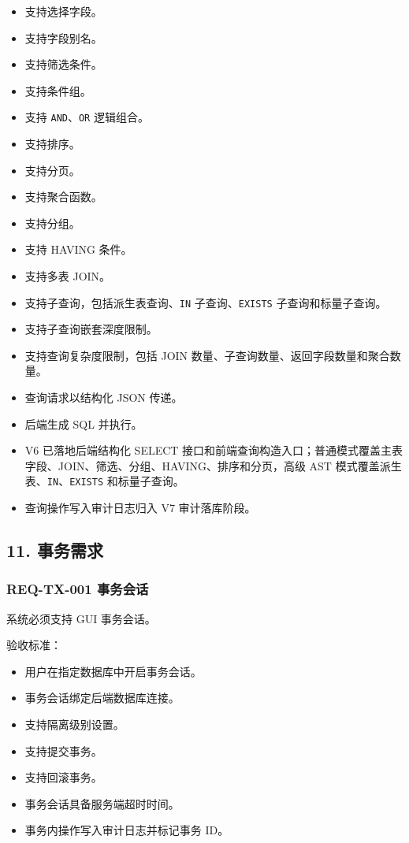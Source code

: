 \documentclass[
  a4paper,
  UTF8]{ctexart}
\providecommand{\tightlist}{%
  \setlength{\itemsep}{0pt}\setlength{\parskip}{0pt}}
\begin{document}
\begin{itemize}
\tightlist
\item
  支持选择字段。
\item
  支持字段别名。
\item
  支持筛选条件。
\item
  支持条件组。
\item
  支持 \texttt{AND}、\texttt{OR} 逻辑组合。
\item
  支持排序。
\item
  支持分页。
\item
  支持聚合函数。
\item
  支持分组。
\item
  支持 HAVING 条件。
\item
  支持多表 JOIN。
\item
  支持子查询，包括派生表查询、\texttt{IN} 子查询、\texttt{EXISTS}
  子查询和标量子查询。
\item
  支持子查询嵌套深度限制。
\item
  支持查询复杂度限制，包括 JOIN
  数量、子查询数量、返回字段数量和聚合数量。
\item
  查询请求以结构化 JSON 传递。
\item
  后端生成 SQL 并执行。
\item
  V6 已落地后端结构化 SELECT
  接口和前端查询构造入口；普通模式覆盖主表字段、JOIN、筛选、分组、HAVING、排序和分页，高级
  AST 模式覆盖派生表、\texttt{IN}、\texttt{EXISTS} 和标量子查询。
\item
  查询操作写入审计日志归入 V7 审计落库阶段。
\end{itemize}

\hypertarget{ux4e8bux52a1ux9700ux6c42}{%
\subsection{11. 事务需求}\label{ux4e8bux52a1ux9700ux6c42}}

\hypertarget{req-tx-001-ux4e8bux52a1ux4f1aux8bdd}{%
\subsubsection{REQ-TX-001
事务会话}\label{req-tx-001-ux4e8bux52a1ux4f1aux8bdd}}

系统必须支持 GUI 事务会话。

验收标准：

\begin{itemize}
\tightlist
\item
  用户在指定数据库中开启事务会话。
\item
  事务会话绑定后端数据库连接。
\item
  支持隔离级别设置。
\item
  支持提交事务。
\item
  支持回滚事务。
\item
  事务会话具备服务端超时时间。
\item
  事务内操作写入审计日志并标记事务 ID。
\end{itemize}
\end{document}
